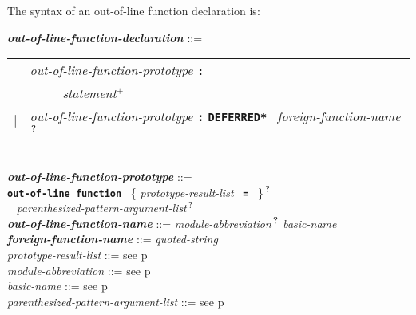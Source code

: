 \documentclass[12pt]{article}
\newcommand{\TT}[1]{{\tt \bfseries #1}}
\newcommand{\PLUS}[1][]{{$^{+#1}$}}
\newcommand{\QMARK}{{$^{\,\mbox{\footnotesize ?}}$}}
\newcommand{\ttkey}[1]{{\tt \bfseries #1}}
\newcommand{\emkey}[1]{{\em \bfseries #1}}
\newcommand{\pagref}[1]{p\pageref{#1}}
\newenvironment{indpar}[1][0.3in]%
	{\begin{list}{}%
		     {\setlength{\itemsep}{0in}%
		      \setlength{\topsep}{0in}%
		      \setlength{\parsep}{1ex}%
		      \setlength{\labelwidth}{#1}%
		      \setlength{\leftmargin}{#1}%
		      \addtolength{\leftmargin}{\labelsep}}%
	 \item}%
	{\end{list}}
\begin{document}
The syntax of an out-of-line function declaration is:

\begin{indpar}
\emkey{out-of-line-function-declaration}%
	\label{OUT-OF-LINE-FUNCTION-DECLARATION} ::= \\
\hspace*{0.5in}
    \begin{tabular}[t]{rl}
        &  {\em out-of-line-function-prototype} \TT{:} \\
	& \TT{~~~~~}{\em statement}\PLUS{} \\
    $|$ &  {\em out-of-line-function-prototype} \TT{:}
    		\ttkey{*DEFERRED*}~ {\em foreign-function-name}\QMARK{} \\
    \end{tabular}
\\[2ex]
\emkey{out-of-line-function-prototype}%
	\label{OUT-OF-LINE-FUNCTION-PROTOTYPE} ::= \\
\hspace*{0.25in} \ttkey{out-of-line function}~
          \{ {\em prototype-result-list}~ \TT{=}~ \}\QMARK{} \\
\hspace*{0.5in}{\em out-of-line-function-name}~
	      {\em parenthesized-pattern-argument-list}\QMARK{}
\\[0.5ex]
\emkey{out-of-line-function-name} ::=
    {\em module-abbreviation}\QMARK{} {\em basic-name}
\\[0.5ex]
\emkey{foreign-function-name}\label{FOREIGN-FUNCTION-NAME}
	::= {\em quoted-string}
\\[0.5ex]
{\em prototype-result-list} ::= see \pagref{PROTOTYPE-RESULT-LIST}
\\[0.5ex]
{\em module-abbreviation} ::= see \pagref{MODULE-ABBREVIATION}
\\[0.5ex]
{\em basic-name} ::= see \pagref{BASIC-NAME}
\\[0.5ex]
{\em parenthesized-pattern-argument-list} ::=
    see \pagref{PARENTHESIZED-PATTERN-ARGUMENT-LIST}


\end{indpar}
\end{document}
